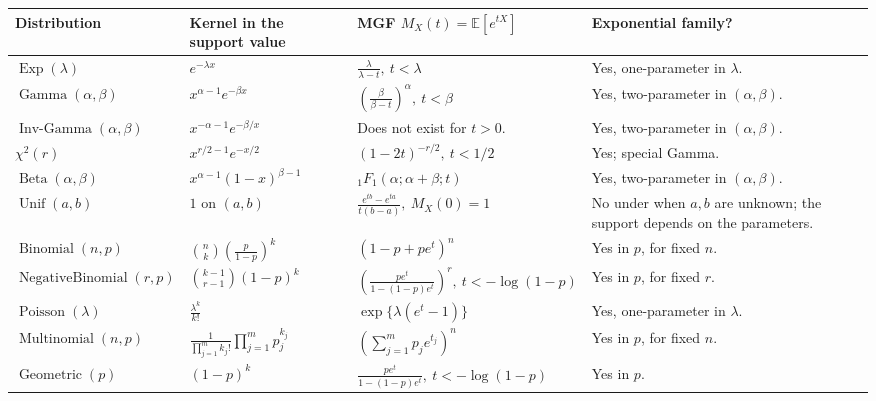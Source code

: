 \documentclass{article}
\theoremstyle{break}
\newcommand{\E}{\ensuremath{\mathbb{E}}}
\DeclareMathOperator{\Binomial}{Binomial}
\DeclareMathOperator{\Geometric}{Geometric}
\DeclareMathOperator{\Multinomial}{Multinomial}
\DeclareMathOperator{\NegativeBinomial}{NegativeBinomial}
\begin{document}
\begin{center}
\begin{tabular}{|p{}|p{}|p{}|p{}|}
\hline
\textbf{Distribution} & \textbf{Kernel in the support value} & \textbf{MGF \(M_X(t)=\E[e^{tX}]\)} & \textbf{Exponential family?} \\
\hline
\(\operatorname{Exp}(\lambda)\) & \(e^{-\lambda x}\) & \(\displaystyle \frac{\lambda}{\lambda-t},\ t<\lambda\) & Yes, one-parameter in \(\lambda\). \\
\hline
\(\operatorname{Gamma}(\alpha,\beta)\) & \(x^{\alpha-1}e^{-\beta x}\) & \(\displaystyle \left(\frac{\beta}{\beta-t}\right)^\alpha,\ t<\beta\) & Yes, two-parameter in \((\alpha,\beta)\). \\
\hline
\(\operatorname{Inv\text{-}Gamma}(\alpha,\beta)\) & \(x^{-\alpha-1}e^{-\beta/x}\) & Does not exist for \(t>0\). & Yes, two-parameter in \((\alpha,\beta)\). \\
\hline
\(\chi^2(r)\) & \(x^{r/2-1}e^{-x/2}\) & \(\displaystyle (1-2t)^{-r/2},\ t<1/2\) & Yes; special Gamma. \\
\hline
\(\operatorname{Beta}(\alpha,\beta)\) & \(x^{\alpha-1}(1-x)^{\beta-1}\) & \(\displaystyle {}_1F_1(\alpha;\alpha+\beta;t)\) & Yes, two-parameter in \((\alpha,\beta)\). \\
\hline
\(\operatorname{Unif}(a,b)\) & \(1\) on \((a,b)\) & \(\displaystyle \frac{e^{tb}-e^{ta}}{t(b-a)},\ M_X(0)=1\) & No under when \(a,b\) are unknown; the support depends on the parameters.\\
\hline
\(\Binomial(n,p)\) & \(\displaystyle \binom{n}{k}\left(\frac{p}{1-p}\right)^k\) & \(\displaystyle (1-p+pe^t)^n\) & Yes in \(p\), for fixed \(n\). \\
\hline
\(\NegativeBinomial(r,p)\) & \(\displaystyle \binom{k-1}{r-1}(1-p)^k\) & \(\displaystyle \left(\frac{pe^t}{1-(1-p)e^t}\right)^r,\ t<-\log(1-p)\) & Yes in \(p\), for fixed \(r\). \\
\hline
\(\operatorname{Poisson}(\lambda)\) & \(\displaystyle \frac{\lambda^k}{k!}\) & \(\displaystyle \exp\{\lambda(e^t-1)\}\) & Yes, one-parameter in \(\lambda\). \\
\hline
\(\Multinomial(n,p)\) & \(\displaystyle \frac{1}{\prod_{j=1}^m k_j!}\prod_{j=1}^m p_j^{k_j}\) & \(\displaystyle \left(\sum_{j=1}^m p_j e^{t_j}\right)^n\) & Yes in \(p\), for fixed \(n\). \\
\hline
\(\Geometric(p)\) & \((1-p)^k\) & \(\displaystyle \frac{pe^t}{1-(1-p)e^t},\ t<-\log(1-p)\) & Yes in \(p\). \\
\hline
\end{tabular}
\end{center}
\end{document}
